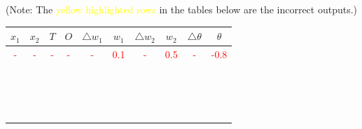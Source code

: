 \documentclass{book}
\begin{document}
{\scriptsize (Note: The \textcolor{yellow}{yellow highlighted rows} in the tables below are the incorrect outputs.)}
\newpage
{}\\
\begin{center}
    \begin{tabular}{|c|c|c|c|c|c|c|c|c|c|}
        \hline
        \rowcolor{lightblue}
        \textbf{\(x_1\)} & \textbf{\(x_2\)} & \textbf{\(T\)} & \textbf{\(O\)} & \textbf{\(\triangle w_1\)} & \textbf{\(w_1\)} & \textbf{\(\triangle w_2\)} & \textbf{\(w_2\)} & \textbf{\(\triangle \theta\)} & \textbf{\(\theta\)}\\
        \hline
        \textcolor{red}{-} & \textcolor{red}{-} & \textcolor{red}{-} & \textcolor{red}{-} & \textcolor{red}{-} & \textcolor{red}{0.1} & \textcolor{red}{-} & \textcolor{red}{0.5} & \textcolor{red}{-} & \textcolor{red}{-0.8}\\      \hline
        & & & & & & & & & \\
        \hline
        & & & & & & & & & \\
        \hline
        & & & & & & & & & \\
        \hline
        & & & & & & & & & \\
        \hline
        & & & & & & & & & \\
        \hline
        & & & & & & & & & \\
        \hline
        & & & & & & & & & \\
        \hline
        & & & & & & & & & \\
        \hline
        & & & & & & & & & \\
        \hline
        & & & & & & & & & \\
        \hline
        & & & & & & & & & \\
        \hline
        & & & & & & & & & \\
        \hline
        & & & & & & & & & \\
        \hline
        & & & & & & & & & \\
        \hline
        & & & & & & & & & \\
        \hline
        & & & & & & & & & \\
        \hline
    \end{tabular}
\end{center}
\vspace{1cm}
\\
\end{document}

